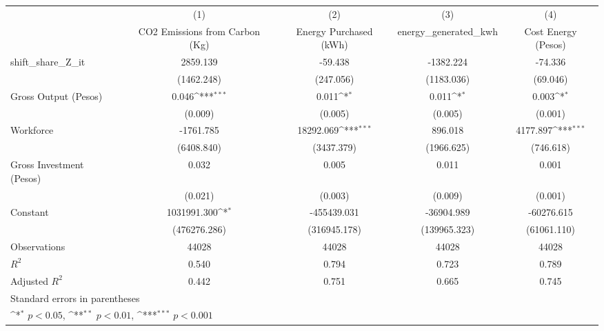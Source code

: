 {
\def\sym#1{\ifmmode^{#1}\else\(^{#1}\)\fi}
\begin{tabular}{l*{4}{c}}
\hline\hline
                &\multicolumn{1}{c}{(1)}&\multicolumn{1}{c}{(2)}&\multicolumn{1}{c}{(3)}&\multicolumn{1}{c}{(4)}\\
                &\multicolumn{1}{c}{CO2 Emissions from Carbon (Kg)}&\multicolumn{1}{c}{Energy Purchased (kWh)}&\multicolumn{1}{c}{energy\_generated\_kwh}&\multicolumn{1}{c}{Cost Energy (Pesos)}\\
\hline
shift\_share\_Z\_it& 2859.139         &  -59.438         &-1382.224         &  -74.336         \\
                &(1462.248)         &(247.056)         &(1183.036)         & (69.046)         \\
[1em]
Gross Output (Pesos)&    0.046\sym{***}&    0.011\sym{*}  &    0.011\sym{*}  &    0.003\sym{*}  \\
                &  (0.009)         &  (0.005)         &  (0.005)         &  (0.001)         \\
[1em]
Workforce       &-1761.785         &18292.069\sym{***}&  896.018         & 4177.897\sym{***}\\
                &(6408.840)         &(3437.379)         &(1966.625)         &(746.618)         \\
[1em]
Gross Investment (Pesos)&    0.032         &    0.005         &    0.011         &    0.001         \\
                &  (0.021)         &  (0.003)         &  (0.009)         &  (0.001)         \\
[1em]
Constant        &1031991.300\sym{*}  &-455439.031         &-36904.989         &-60276.615         \\
                &(476276.286)         &(316945.178)         &(139965.323)         &(61061.110)         \\
\hline
Observations    &    44028         &    44028         &    44028         &    44028         \\
\(R^{2}\)       &    0.540         &    0.794         &    0.723         &    0.789         \\
Adjusted \(R^{2}\)&    0.442         &    0.751         &    0.665         &    0.745         \\
\hline\hline
\multicolumn{5}{l}{\footnotesize Standard errors in parentheses}\\
\multicolumn{5}{l}{\footnotesize \sym{*} \(p<0.05\), \sym{**} \(p<0.01\), \sym{***} \(p<0.001\)}\\
\end{tabular}
}
